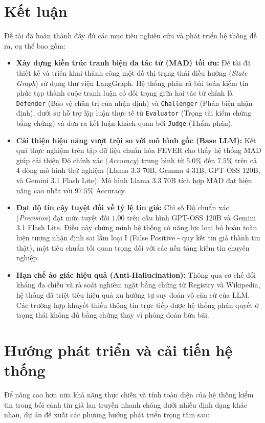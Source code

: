 \documentclass[12pt,a4paper]{report}
\begin{document}
\section{Kết luận}
Đề tài đã hoàn thành đầy đủ các mục tiêu nghiên cứu và phát triển hệ thống đề ra, cụ thể bao gồm:
\begin{itemize}
    \item \textbf{Xây dựng kiến trúc tranh biện đa tác tử (MAD) tối ưu:} Đề tài đã thiết kế và triển khai thành công một đồ thị trạng thái điều hướng (\textit{State Graph}) sử dụng thư viện LangGraph. Hệ thống phân rã bài toán kiểm tin phức tạp thành cuộc tranh luận có đối trọng giữa hai tác tử chính là \texttt{Defender} (Bảo vệ chân trị của nhận định) và \texttt{Challenger} (Phản biện nhận định), dưới sự hỗ trợ lập luận thực tế từ \texttt{Evaluator} (Trọng tài kiểm chứng bằng chứng) và đưa ra kết luận khách quan bởi \texttt{Judge} (Thẩm phán).
    \item \textbf{Cải thiện hiệu năng vượt trội so với mô hình gốc (Base LLM):} Kết quả thực nghiệm trên tập dữ liệu chuẩn hóa FEVER cho thấy hệ thống MAD giúp cải thiện Độ chính xác (\textit{Accuracy}) trung bình từ $5.0\%$ đến $7.5\%$ trên cả 4 dòng mô hình thử nghiệm (Llama 3.3 70B, Gemma 4-31B, GPT-OSS 120B, và Gemini 3.1 Flash Lite). Mô hình Llama 3.3 70B tích hợp MAD đạt hiệu năng cao nhất với $97.5\%$ Accuracy.
    \item \textbf{Đạt độ tin cậy tuyệt đối về tỷ lệ tin giả:} Chỉ số Độ chuẩn xác (\textit{Precision}) đạt mức tuyệt đối $1.00$ trên cấu hình GPT-OSS 120B và Gemini 3.1 Flash Lite. Điều này chứng minh hệ thống có năng lực loại bỏ hoàn toàn hiện tượng nhận định sai lầm loại I (False Positive - quy kết tin giả thành tin thật), một tiêu chuẩn tối quan trọng đối với các nền tảng kiểm tin chuyên nghiệp.
    \item \textbf{Hạn chế ảo giác hiệu quả (Anti-Hallucination):} Thông qua cơ chế đối kháng đa chiều và rà soát nghiêm ngặt bằng chứng từ Registry và Wikipedia, hệ thống đã triệt tiêu hiệu quả xu hướng tự suy đoán vô căn cứ của LLM. Các trường hợp khuyết thiếu thông tin trực tiếp được hệ thống phán quyết ở trạng thái không đủ bằng chứng thay vì phỏng đoán bừa bãi.
\end{itemize}

\section{Hướng phát triển và cải tiến hệ thống}
Để nâng cao hơn nữa khả năng thực chiến và tính toàn diện của hệ thống kiểm tin trong bối cảnh tin giả lan truyền nhanh chóng dưới nhiều định dạng khác nhau, dự án đề xuất các phương hướng phát triển trọng tâm sau:
\end{document}
